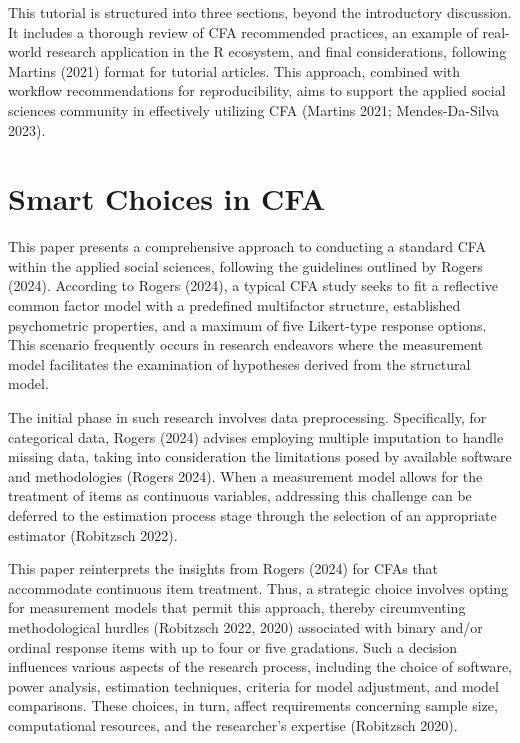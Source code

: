 \documentclass[
  a4paper,
]{article}
\begin{document}
This tutorial is structured into three sections, beyond the introductory
discussion. It includes a thorough review of CFA recommended practices,
an example of real-world research application in the R ecosystem, and
final considerations, following Martins (2021) format for tutorial
articles. This approach, combined with workflow recommendations for
reproducibility, aims to support the applied social sciences community
in effectively utilizing CFA (Martins 2021; Mendes-Da-Silva 2023).


\section{Smart Choices in CFA}\label{smart-choices-in-cfa}

This paper presents a comprehensive approach to conducting a standard
CFA within the applied social sciences, following the guidelines
outlined by Rogers (2024). According to Rogers (2024), a typical CFA
study seeks to fit a reflective common factor model with a predefined
multifactor structure, established psychometric properties, and a
maximum of five Likert-type response options. This scenario frequently
occurs in research endeavors where the measurement model facilitates the
examination of hypotheses derived from the structural model.

The initial phase in such research involves data preprocessing.
Specifically, for categorical data, Rogers (2024) advises employing
multiple imputation to handle missing data, taking into consideration
the limitations posed by available software and methodologies (Rogers
2024). When a measurement model allows for the treatment of items as
continuous variables, addressing this challenge can be deferred to the
estimation process stage through the selection of an appropriate
estimator (Robitzsch 2022).

This paper reinterprets the insights from Rogers (2024) for CFAs that
accommodate continuous item treatment. Thus, a strategic choice involves
opting for measurement models that permit this approach, thereby
circumventing methodological hurdles (Robitzsch 2022, 2020) associated
with binary and/or ordinal response items with up to four or five
gradations. Such a decision influences various aspects of the research
process, including the choice of software, power analysis, estimation
techniques, criteria for model adjustment, and model comparisons. These
choices, in turn, affect requirements concerning sample size,
computational resources, and the researcher's expertise (Robitzsch
2020).
\end{document}
